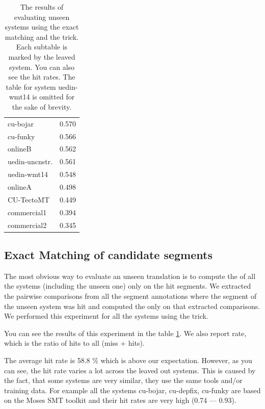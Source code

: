 \begin{table}
{\begin{tabular}{|l|c|}
           cu-bojar            &   0.570 \\
           cu-funky            &   0.566 \\
           onlineB                &   0.562 \\
           uedin-uncnstr. &   0.561 \\
           uedin-wmt14         &   0.548 \\
           onlineA                &   0.498 \\
           CU-TectoMT          &   0.449 \\
           commercial1         &   0.394 \\
           commercial2         &   0.345 \\
          \hline
         \end{tabular}
      \label{}
    }

    \caption[Results of evaluating unseen systems by exact matching]{The
      results of evaluating unseen systems using the exact matching and the
       trick. Each subtable is marked by the leaved
      system.  You can also see the hit rates. The table for system uedin-wmt14
      is omitted for the sake of brevity.}

  \label{one-out-results}
\end{table}

\subsection{Exact Matching of candidate segments}
\label{exact:matching}

The most obvious way to evaluate an unseen translation is to compute the
 of all the systems (including the unseen
one) only on the hit segments. We extracted the pairwise comparisons from all
the segment annotations where the segment of the unseen system was hit and
computed the  only on that extracted
comparisons. We performed this experiment for all the systems using the
 trick.

You can see the results of this experiment in the table \ref{one-out-results}.
We also report  rate, which is the ratio of hits to all (miss +
hits).

The average hit rate is 58.8 \% which is above our expectation. However, as you
can see, the hit rate varies a lot across the leaved out systems. This is
caused by the fact, that some systems are very similar, they use the same tools
and/or training data. For example all the systems cu-bojar, cu-depfix, cu-funky
are based on the Moses SMT toolkit and their hit rates are very high (0.74 ---
0.93).

